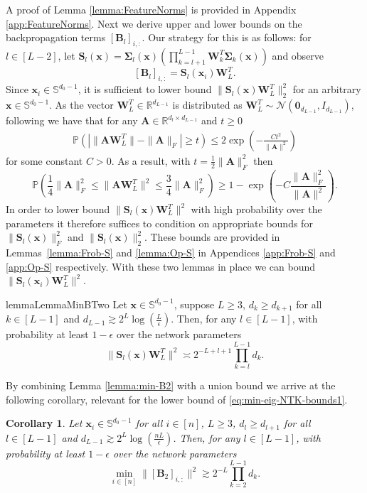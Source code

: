 \documentclass{article}
\newtheorem{corollary}[theorem]{Corollary}
\theoremstyle{definition}
\newcommand*{\R}{\mathbb{R}}
\renewcommand{\P}{\mathbb{P}}
\renewcommand{\S}{\mathbb{S}}
\def\vx{{\bm{x}}}
\def\mA{{\bm{A}}}
\def\mB{{\bm{B}}}
\def\mS{{\bm{S}}}
\def\mW{{\bm{W}}}
\def\mSigma{{\bm{\Sigma}}}
\begin{document}
A proof of Lemma \ref{lemma:FeatureNorms} is provided in Appendix \ref{app:FeatureNorms}. Next we derive upper and lower bounds on the backpropagation terms $[\mB_l]_{i,:}$. Our strategy for this is as follows: for $l\in [L-2]$, let $\mS_{l}(\vx) = \mSigma_l(\vx) \left( \prod_{k = l+1}^{L-1} \mW_k^T \mSigma_k(\vx) \right)$ and observe 
\[
[\mB_l]_{i,:} = \mS_{l}(\vx_i)\mW_L^T.
\]
Since $\vx_i \in \S^{d_0-1}$, it is sufficient to lower bound $\| \mS_{l}(\vx) \mW_L^T\|_2^2$ for an arbitrary $\vx \in \S^{d_0-1}$. As the vector $\mW_L^T \in \R^{d_{L-1}}$ is distributed as $\mW_L^T \sim \mathcal{N}(\textbf{0}_{d_{L-1}}, \textit{I}_{d_{L-1}})$, 
following \citet[Theorem 6.3.2]{vershynin2018high}
we have that for any $\mA \in \R^{d_l \times d_{L-1}}$ and $t \geq 0$ \begin{align*}
    \P( | \|\mA \mW_L^T \| - \|\mA \|_F | \geq t) \leq 2 \exp \left( -\frac{Ct^2}{ \|\mA \|^2}\right)
\end{align*}
for some constant $C>0$. As a result, with $t = \tfrac{1}{2}\| \mA \|_F^2$ then
\[
\P \left( \frac{1}{4} \| \mA \|_F^2 \leq \| \mA \mW_L^T \|^2 \leq \frac{3}{4} \| \mA \|_F^2 \right) \geq 1 - \exp\left( -C\frac{\| \mA \|_F^2}{\| \mA \|^2}\right).
\]
In order to lower bound $\| \mS_{l}(\vx) \mW_L^T \|^2$ with high probability over the parameters it therefore suffices to condition on appropriate bounds for $\| \mS_{l}(\vx) \|_F^2$ and $\| \mS_{l}(\vx) \|_2^2$. These bounds are provided in Lemmas~\ref{lemma:Frob-S} and \ref{lemma:Op-S} in Appendices \ref{app:Frob-S} and \ref{app:Op-S} respectively. 
With these two lemmas in place we can bound $\|\mS_{l}(\vx_i)\mW_L^T\|^2$.

\begin{restatable}{lemma}{LemmaMinBTwo}\label{lemma:min-B2}
    Let $\vx \in \S^{d_0-1}$, suppose $L \geq 3$, $d_k \geq d_{k+1}$ for all $k \in [L - 1]$ and $d_{L-1} \gtrsim 2^L \log \left (\frac{L}{\epsilon}\right)$. 
   Then, for any $l \in [L-1]$, with probability at least $1 - \epsilon$ over the network parameters     \[
       \|\mS_l(\vx) \mW_L^T \|^2 \asymp 2^{-L+l+1}\prod_{k = l}^{L-1} d_k . 
    \]
\end{restatable}

By combining Lemma \ref{lemma:min-B2} with a union bound we arrive at the following corollary, relevant for the lower bound of \eqref{eq:min-eig-NTK-bounds1}.
\begin{corollary} \label{corr:B2-lb}
    Let $\vx_i \in \S^{d_0-1}$ for all $i \in [n]$, $L \geq 3$, $d_l \geq d_{l+1}$ for all $l \in [L - 1]$ and $d_{L-1} \gtrsim 2^L \log \left (\frac{nL}{\epsilon}\right)$. Then, for any $l \in [L-1]$, with probability at least $1 - \epsilon$ over the network parameters     \[
    \min_{i \in [n]} \|[\mB_2]_{i,:} \|^2 \gtrsim 2^{-L} \prod_{k = 2}^{L-1} d_k . 
    \]
\end{corollary}
\end{document}
